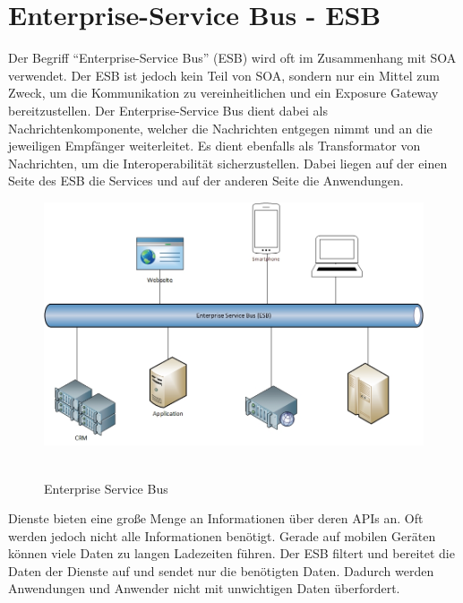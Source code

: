 \section{Enterprise-Service Bus - ESB}
\label{sec:esb}
Der Begriff "`Enterprise-Service Bus"' (ESB) wird oft im Zusammenhang mit SOA verwendet. Der ESB ist jedoch kein Teil von SOA, sondern nur ein Mittel zum Zweck, um die Kommunikation zu vereinheitlichen und ein Exposure Gateway bereitzustellen. Der Enterprise-Service Bus dient dabei als Nachrichtenkomponente, welcher die Nachrichten entgegen nimmt und an die jeweiligen Empfänger weiterleitet. Es dient ebenfalls als Transformator von Nachrichten, um die Interoperabilität sicherzustellen. Dabei liegen auf der einen Seite des ESB die Services und auf der anderen Seite die Anwendungen.

\begin{figure}[htb]
    \centering 
    \includegraphics[width=\linewidth]{content/images/ESB}\
    \caption[ESB]{Enterprise Service Bus}
    \label{fig:esb}  
\end{figure}
\newpage
Dienste bieten eine große Menge an Informationen über deren APIs an. Oft werden jedoch nicht alle Informationen benötigt. Gerade auf mobilen Geräten können viele Daten zu langen Ladezeiten führen. Der ESB filtert und bereitet die Daten der Dienste auf und sendet nur die benötigten Daten. Dadurch werden Anwendungen und Anwender nicht mit unwichtigen Daten überfordert.